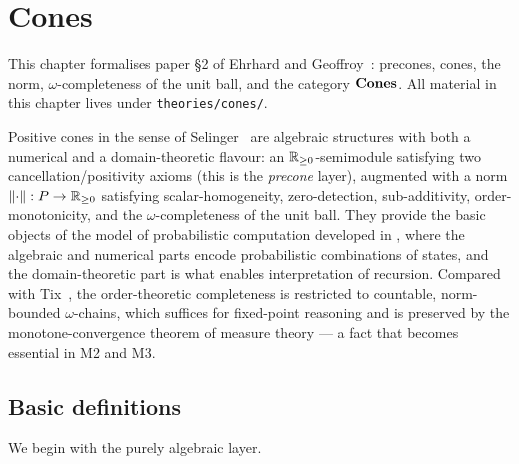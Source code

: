 %

\chapter{Cones}\label{ch:cones}

This chapter formalises paper \S2 of Ehrhard and
Geoffroy~\cite{ehrhard-geoffroy-icones}: precones, cones, the
norm, $\omega$-completeness of the unit ball, and the category
$\mathbf{Cones}$. All material in this chapter lives under
\texttt{theories/cones/}.

Positive cones in the sense of Selinger~\cite{ehrhard-geoffroy-icones}
are algebraic structures with both a numerical and a domain-theoretic
flavour: an $\mathbb{R}_{\geq 0}$-semimodule satisfying two cancellation/positivity
axioms (this is the \emph{precone} layer), augmented with a norm
$\lVert \cdot \rVert : P \to \mathbb{R}_{\geq 0}$ satisfying scalar-homogeneity,
zero-detection, sub-additivity, order-monotonicity, and the
$\omega$-completeness of the unit ball. They provide the basic
objects of the model of probabilistic computation developed in
\cite{ehrhard-geoffroy-icones}, where the algebraic and numerical
parts encode probabilistic combinations of states, and the
domain-theoretic part is what enables interpretation of recursion.
Compared with Tix~\cite{ehrhard-geoffroy-icones}, the order-theoretic
completeness is restricted to countable, norm-bounded
$\omega$-chains, which suffices for fixed-point reasoning and is
preserved by the monotone-convergence theorem of measure theory ---
a fact that becomes essential in M2 and M3.

\section{Basic definitions}\label{sec:precones}

We begin with the purely algebraic layer.


